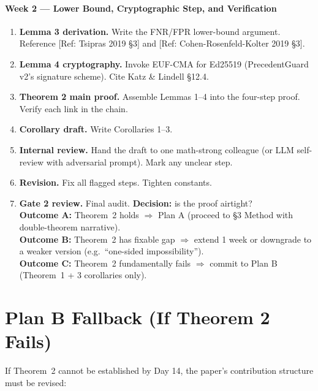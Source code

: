 \documentclass[11pt]{article}
\newcommand{\REF}[1]{{\color{teal}\textsf{[Ref: #1]}}}
\theoremstyle{plain}
\theoremstyle{definition}
\begin{document}
\paragraph{Week 2 --- Lower Bound, Cryptographic Step, and Verification}

\begin{enumerate}[label=\textbf{Day \arabic*.}, leftmargin=*, start=8]
  \item \textbf{Lemma 3 derivation.} Write the FNR/FPR lower-bound argument.
        Reference \REF{Tsipras 2019 \S 3} and \REF{Cohen-Rosenfeld-Kolter 2019 \S 3}.
  \item \textbf{Lemma 4 cryptography.} Invoke EUF-CMA for Ed25519
        (PrecedentGuard v2's signature scheme). Cite Katz \& Lindell \S 12.4.
  \item \textbf{Theorem 2 main proof.} Assemble Lemmas 1--4 into the four-step
        proof. Verify each link in the chain.
  \item \textbf{Corollary draft.} Write Corollaries 1--3.
  \item \textbf{Internal review.} Hand the draft to one math-strong colleague
        (or LLM self-review with adversarial prompt). Mark any unclear step.
  \item \textbf{Revision.} Fix all flagged steps. Tighten constants.
  \item \textbf{Gate 2 review.} Final audit.
        \textbf{Decision:} is the proof airtight?
        \\\textbf{Outcome A:} Theorem~2 holds $\Rightarrow$ Plan A
        (proceed to \S 3 Method with double-theorem narrative).
        \\\textbf{Outcome B:} Theorem~2 has fixable gap $\Rightarrow$
        extend 1 week or downgrade to a weaker version
        (e.g.\ ``one-sided impossibility'').
        \\\textbf{Outcome C:} Theorem~2 fundamentally fails $\Rightarrow$
        commit to Plan B (Theorem~1 + 3 corollaries only).
\end{enumerate}

\section{Plan B Fallback (If Theorem 2 Fails)}

If Theorem~2 cannot be established by Day 14, the paper's contribution
structure must be revised:
\end{document}
